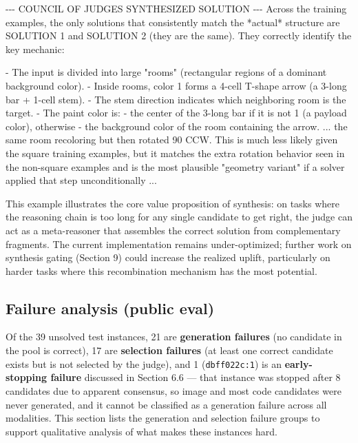 \documentclass[11pt]{article}
\newenvironment{Shaded}{}{}
\newcommand{\NormalTok}[1]{#1}
\begin{document}
\begin{Shaded}
\begin{Highlighting}[]
\NormalTok{{-}{-}{-} COUNCIL OF JUDGES SYNTHESIZED SOLUTION {-}{-}{-}}
\NormalTok{Across the training examples, the only solutions that}
\NormalTok{consistently match the *actual* structure are SOLUTION 1}
\NormalTok{and SOLUTION 2 (they are the same). They correctly}
\NormalTok{identify the key mechanic:}

\NormalTok{{-} The input is divided into large "rooms" (rectangular}
\NormalTok{  regions of a dominant background color).}
\NormalTok{{-} Inside rooms, color 1 forms a 4{-}cell T{-}shape arrow}
\NormalTok{  (a 3{-}long bar + 1{-}cell stem).}
\NormalTok{{-} The stem direction indicates which neighboring room}
\NormalTok{  is the target.}
\NormalTok{{-} The paint color is:}
\NormalTok{  {-} the center of the 3{-}long bar if it is not 1}
\NormalTok{    (a payload color), otherwise}
\NormalTok{  {-} the background color of the room containing}
\NormalTok{    the arrow.}
\NormalTok{...}
\NormalTok{the same room recoloring but then rotated 90 CCW.}
\NormalTok{This is much less likely given the square training}
\NormalTok{examples, but it matches the extra rotation behavior}
\NormalTok{seen in the non{-}square examples and is the most}
\NormalTok{plausible "geometry variant" if a solver applied}
\NormalTok{that step unconditionally}
\NormalTok{...}
\end{Highlighting}
\end{Shaded}

This example illustrates the core value proposition of synthesis: on
tasks where the reasoning chain is too long for any single candidate to
get right, the judge can act as a meta-reasoner that assembles the
correct solution from complementary fragments. The current
implementation remains under-optimized; further work on synthesis gating
(Section 9) could increase the realized uplift, particularly on harder
tasks where this recombination mechanism has the most potential.

\hypertarget{failure-analysis-public-eval}{%
\subsection{Failure analysis (public
eval)}\label{failure-analysis-public-eval}}

Of the 39 unsolved test instances, 21 are \textbf{generation failures}
(no candidate in the pool is correct), 17 are \textbf{selection
failures} (at least one correct candidate exists but is not selected by
the judge), and 1 (\texttt{dbff022c:1}) is an \textbf{early-stopping
failure} discussed in Section 6.6 --- that instance was stopped after 8
candidates due to apparent consensus, so image and most code candidates
were never generated, and it cannot be classified as a generation
failure across all modalities. This section lists the generation and
selection failure groups to support qualitative analysis of what makes
these instances hard.
\end{document}
